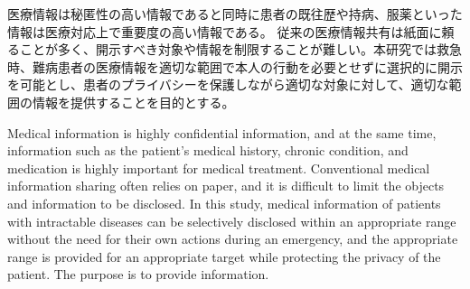 


\begin{jabstract}

医療情報は秘匿性の高い情報であると同時に患者の既往歴や持病、服薬といった情報は医療対応上で重要度の高い情報である。
従来の医療情報共有は紙面に頼ることが多く、開示すべき対象や情報を制限することが難しい。本研究では救急時、難病患者の医療情報を適切な範囲で本人の行動を必要とせずに選択的に開示を可能とし、患者のプライバシーを保護しながら適切な対象に対して、適切な範囲の情報を提供することを目的とする。

\end{jabstract}



\begin{eabstract}

Medical information is highly confidential information, and at the same time, information such as the patient's medical history, chronic condition, and medication is highly important for medical treatment.
Conventional medical information sharing often relies on paper, and it is difficult to limit the objects and information to be disclosed. In this study, medical information of patients with intractable diseases can be selectively disclosed within an appropriate range without the need for their own actions during an emergency, and the appropriate range is provided for an appropriate target while protecting the privacy of the patient. The purpose is to provide information.

\end{eabstract}
